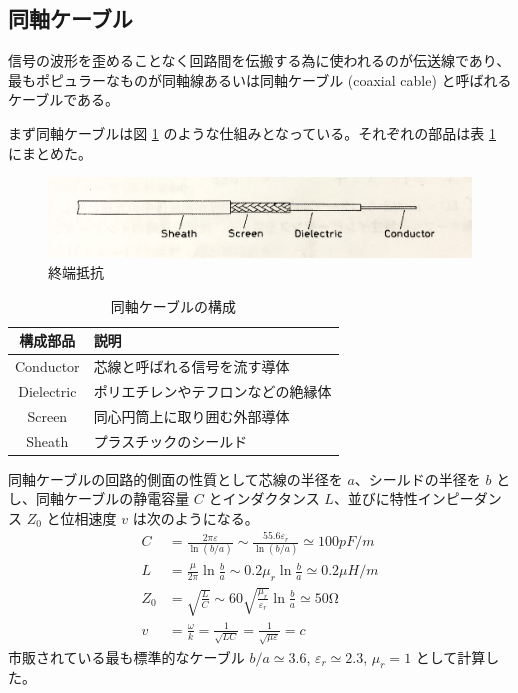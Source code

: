 \documentclass[uplatex,dvipdfmx,a4paper,11pt]{jlreq}
\numberwithin{equation}{section}
\theoremstyle{definition}
\begin{document}
\subsection{同軸ケーブル}
信号の波形を歪めることなく回路間を伝搬する為に使われるのが伝送線であり、最もポピュラーなものが同軸線あるいは同軸ケーブル (coaxial cable) と呼ばれるケーブルである。

まず同軸ケーブルは図 \ref{fig:coaxial cable} のような仕組みとなっている。それぞれの部品は表 \ref{table:coaxial cable} にまとめた。
\begin{figure}[htbp]
  \centering
  \includegraphics[width=14cm]{./assets/coaxial_cable.jpg}
  \caption{終端抵抗}
  \label{fig:coaxial cable}
\end{figure}
\begin{table}
  \centering
  \begin{tabular}{|c|l|}
    \hline
    構成部品       & 説明                \\
    \hline \hline
    Conductor  & 芯線と呼ばれる信号を流す導体    \\
    Dielectric & ポリエチレンやテフロンなどの絶縁体 \\
    Screen     & 同心円筒上に取り囲む外部導体    \\
    Sheath     & プラスチックのシールド       \\
    \hline
  \end{tabular}
  \caption{同軸ケーブルの構成}
  \label{table:coaxial cable}
\end{table}

同軸ケーブルの回路的側面の性質として芯線の半径を $a$、シールドの半径を $b$ とし、同軸ケーブルの静電容量 $C$ とインダクタンス $L$、並びに特性インピーダンス $Z_0$ と位相速度 $v$ は次のようになる。
\begin{align}
  C   & = \frac{2\pi\varepsilon}{\ln(b/a)} \sim \frac{55.6\varepsilon_r}{\ln(b/a)} \simeq 100 \si{pF/m}  \\
  L   & = \frac{\mu}{2\pi}\ln\frac{b}{a} \sim 0.2\mu_r\ln\frac{b}{a} \simeq 0.2 \si{\mu H/m}             \\
  Z_0 & = \sqrt{\frac{L}{C}} \sim 60\sqrt{\frac{\mu_r}{\varepsilon_r}}\ln\frac{b}{a} \simeq 50 \si{\ohm} \\
  v   & = \frac{\omega}{k} = \frac{1}{\sqrt{LC}} = \frac{1}{\sqrt{\mu\varepsilon}} = c
\end{align}
市販されている最も標準的なケーブル $b/a \simeq 3.6$, $\varepsilon_r \simeq 2.3$, $\mu_r = 1$ として計算した。
\end{document}
